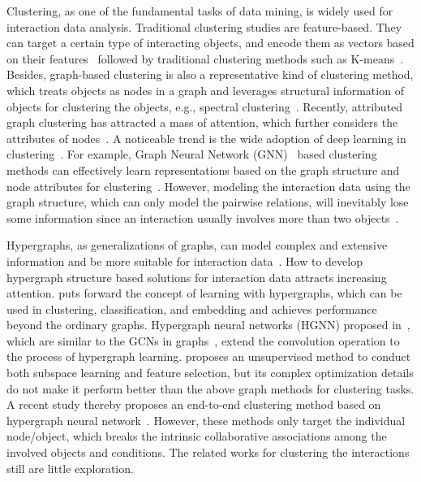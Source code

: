 \documentclass[11pt]{article}
\begin{document}
Clustering, as one of the fundamental tasks of data mining, is widely used for interaction data analysis.
Traditional clustering studies are feature-based. They can target a certain type of interacting objects, and encode them as vectors based on their features~\cite{hinton_reducing_2006} followed by traditional clustering methods such as K-means~\cite{hartigan_algorithm_1979}.
Besides, graph-based clustering is also a representative kind of clustering method, which treats objects as nodes in a graph and leverages structural information of objects for clustering the objects, e.g., spectral clustering~\cite{ng2001spectral}. Recently, attributed graph clustering has attracted a mass of attention, which further considers the attributes of nodes~\cite{yang_effective_2021}. A noticeable trend is the wide adoption of deep learning in clustering~\cite{min_survey_2018}. For example, Graph Neural Network (GNN)~\cite{kipf_semi_supervised_2017,kipf_variational_2016} based clustering methods can effectively learn representations based on the graph structure and node attributes for clustering~\cite{bo_structural_2020,wang_attributed_2019,fan_one2multi_2020,song_deep_2021,yang_variational_2021}.
However, modeling the interaction data using the graph structure, which can only model the pairwise relations, will inevitably lose some information since an interaction usually involves more than two objects~\cite{yang2020hypergraph}.


Hypergraphs, as generalizations of graphs, can model complex and extensive information and be more suitable for interaction data~\cite{zhang_hyper_sagnn_2020,yadati_hypergcn_2019,tran_directed_2020,hu_adaptive_2021}.
How to develop hypergraph structure based solutions for interaction data attracts increasing attention. \cite{zhou_learning_2006} puts forward the concept of learning with hypergraphs, which can be used in clustering, classification, and embedding and achieves performance beyond the ordinary graphs. Hypergraph neural networks (HGNN) proposed in~\cite{feng_hypergraph_2019}, which are similar to the GCNs in graphs~\cite{kipf_semi_supervised_2017}, extend the convolution operation to the process of hypergraph learning. \cite{zhu_adaptive_2017} proposes an unsupervised method to conduct both subspace learning and feature selection, but its complex optimization details do not make it perform better than the above graph methods for clustering tasks. A recent study thereby proposes an end-to-end clustering method based on hypergraph neural network~\cite{hu_adaptive_2021}.
However, these methods only target the individual node/object, which breaks the intrinsic collaborative associations among the involved objects and conditions. The related works for clustering the interactions still are little exploration.
\end{document}
